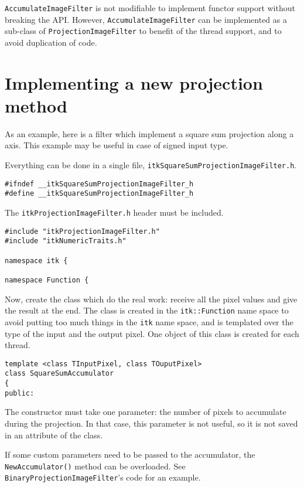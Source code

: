 \documentclass{InsightArticle}
\begin{document}
\verb$AccumulateImageFilter$ is not modifiable to implement functor support without
breaking the API. However, \verb$AccumulateImageFilter$ can be implemented as a
sub-class of \verb$ProjectionImageFilter$ to benefit of the thread support, and to
avoid duplication of code.

\section{Implementing a new projection method}
As an example, here is a filter which implement a square sum projection along a
axis. This example may be useful in case of signed input type.

Everything can be done in a single file, \verb$itkSquareSumProjectionImageFilter.h$.
\small \begin{verbatim}
#ifndef __itkSquareSumProjectionImageFilter_h
#define __itkSquareSumProjectionImageFilter_h
\end{verbatim} \normalsize
The \verb$itkProjectionImageFilter.h$ header must be included.
\small \begin{verbatim}
#include "itkProjectionImageFilter.h"
#include "itkNumericTraits.h"

namespace itk {

namespace Function {
\end{verbatim} \normalsize
Now, create the class which do the real work: receive all the pixel values and
give the result at the end. The class is created in the \verb$itk::Function$ name space
to avoid putting too much things in the \verb$itk$ name space, and is templated over the
type of the input and the output pixel.
One object of this class is created for each thread.
\small \begin{verbatim}
template <class TInputPixel, class TOuputPixel>
class SquareSumAccumulator
{
public:
\end{verbatim} \normalsize
The constructor must take one parameter: the number of pixels to accumulate
during the projection. In that case, this parameter is not useful, so it is not
saved in an attribute of the class.

If some custom parameters need to be passed to the accumulator, the \verb$NewAccumulator()$
method can be overloaded. See \verb$BinaryProjectionImageFilter$'s code for an
example.
\end{document}
